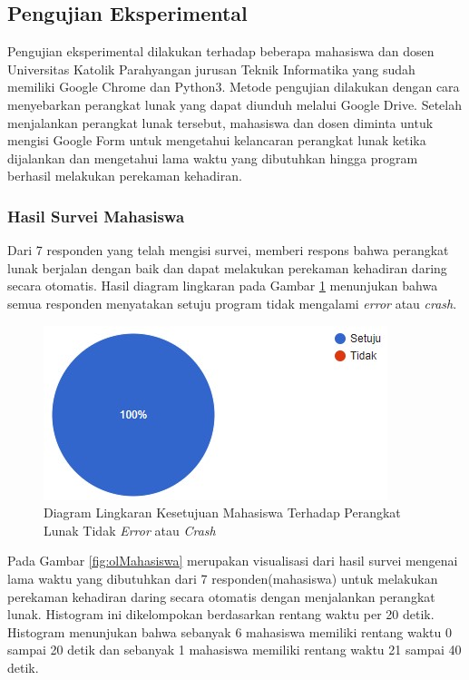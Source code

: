 \newpage
\subsection{Pengujian Eksperimental}
Pengujian eksperimental dilakukan terhadap beberapa mahasiswa dan dosen Universitas Katolik Parahyangan jurusan Teknik Informatika yang sudah memiliki Google Chrome dan Python3. Metode pengujian dilakukan dengan cara menyebarkan perangkat lunak yang dapat diunduh melalui Google Drive. Setelah menjalankan perangkat lunak tersebut, mahasiswa dan dosen diminta untuk mengisi Google Form untuk mengetahui kelancaran perangkat lunak ketika dijalankan dan mengetahui lama waktu yang dibutuhkan hingga program berhasil melakukan perekaman kehadiran. 

\subsubsection{Hasil Survei Mahasiswa}
Dari 7 responden yang telah mengisi survei, memberi respons bahwa perangkat lunak berjalan dengan baik dan dapat melakukan perekaman kehadiran daring secara otomatis. Hasil diagram lingkaran pada Gambar \ref{fig:noerror} menunjukan bahwa semua responden menyatakan setuju program tidak mengalami \textit{error} atau \textit{crash}.
	\begin{figure}[H]
		\centering
		\includegraphics[scale=0.7]{Gambar/diagramLingkaran.jpg}
		\caption{Diagram Lingkaran Kesetujuan Mahasiswa Terhadap Perangkat Lunak Tidak \textit{Error} atau \textit{Crash}} 
		\label{fig:noerror}
	\end{figure}
Pada Gambar \ref{fig:olMahasiswa} merupakan visualisasi dari hasil survei mengenai lama waktu yang dibutuhkan dari 7 responden(mahasiswa) untuk melakukan perekaman kehadiran daring secara otomatis dengan menjalankan perangkat lunak. Histogram ini dikelompokan berdasarkan rentang waktu per 20 detik. Histogram menunjukan bahwa sebanyak 6 mahasiswa memiliki rentang waktu 0 sampai 20 detik dan sebanyak 1 mahasiswa memiliki rentang waktu 21 sampai 40 detik. 
